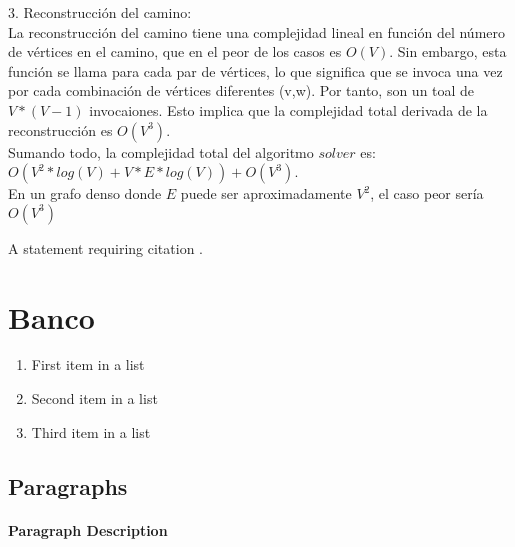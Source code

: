 \documentclass[
10pt, %
a4paper, %
oneside, %
headinclude,footinclude, %
BCOR5mm, %
]{scrartcl}
\begin{document}
3. Reconstrucción del camino:\\

La reconstrucción del camino tiene una complejidad lineal en función del número de vértices en el camino, que en el peor 
de los casos es $O(V)$. Sin embargo, esta función se llama para cada par de vértices, lo que significa que se invoca una vez por cada 
combinación de vértices diferentes (v,w). Por tanto, son un toal de $V*(V-1)$ invocaiones. Esto implica que la complejidad total derivada de la 
reconstrucción es $O(V^3)$. \\

Sumando todo, la complejidad total del algoritmo $solver$ es: $O(V^2 * log(V) + V * E*log(V) ) + O(V^3)$. \\

En un grafo denso donde $E$ puede ser aproximadamente $V^2$, el caso peor sería $O(V^3)$





A statement requiring citation \cite{Figueredo:2009dg}.


 

\section{Banco}

\lipsum[5] %

\begin{enumerate}[noitemsep] %
\item First item in a list
\item Second item in a list
\item Third item in a list
\end{enumerate}


\subsection{Paragraphs}

\lipsum[6] %

\paragraph{Paragraph Description} \lipsum[7] %
\end{document}
